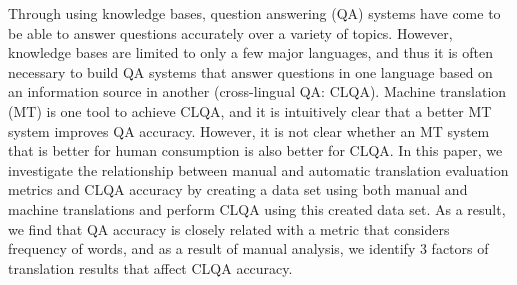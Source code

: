 Through using knowledge bases, question answering (QA) systems have come to be able to answer questions accurately over a variety of topics. However, knowledge bases are limited to only a few major languages, and thus it is often necessary to build QA systems that answer questions in one language based on an information source in another (cross-lingual QA: CLQA). Machine translation (MT) is one tool to achieve CLQA, and it is intuitively clear that a better MT system improves QA accuracy. However, it is not clear whether an MT system that is better for human consumption is also better for CLQA. In this paper, we investigate the relationship between manual and automatic translation evaluation metrics and CLQA accuracy by creating a data set using both manual and machine translations and perform CLQA using this created data set. As a result, we find that QA accuracy is closely related with a metric that considers frequency of words, and as a result of manual analysis, we identify 3 factors of translation results that affect CLQA accuracy.
